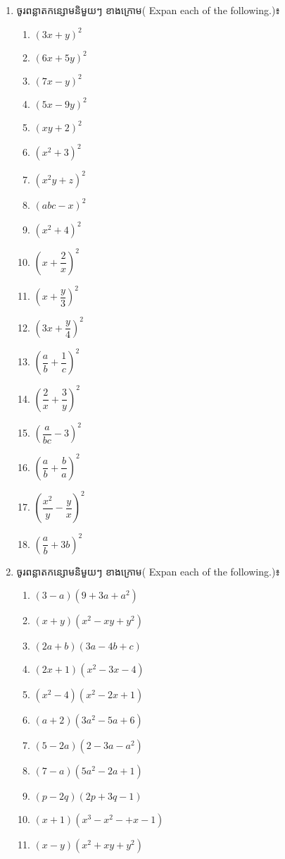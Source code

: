 \begin{enumerate}
\item  ចូរពន្លាតកន្សោមនិមួយៗ ខាងក្រោម( Expan each of the following.)៖
\begin{multicols}{3}
\begin{enumerate}[label=\alph*.]
\item $(3x+y)^2$
\item $(6x+5y)^2$
\item $(7x-y)^2$
\item $(5x-9y)^2$
\item $(xy+2)^2$
\item $(x^2+3)^2$
\item $(x^2y+z)^2$
\item $(abc-x)^2$
\item $(x^2+4)^2$
\item $\left(x+\dfrac{2}{x} \right)^2$
\item $\left(x+\dfrac{y}{3} \right)^2$
\item $\left( 3x+\dfrac{y}{4}\right)^2$
\item $\left(\dfrac{a}{b}+\dfrac{1}{c} \right)^2$
\item $\left( \dfrac{2}{x}+\dfrac{3}{y}\right)^2$
\item $\left(\dfrac{a}{bc} -3\right)^2$
\item $\left(\dfrac{a}{b}+\dfrac{b}{a}\right)^2$
\item $\left( \dfrac{x^2}{y}-\dfrac{y}{x}\right)^2$
\item $\left( \dfrac{a}{b}+3b\right)^2$
\end{enumerate}
\end{multicols}
\item  ចូរពន្លាតកន្សោមនិមួយៗ ខាងក្រោម( Expan each of the following.)៖
\begin{multicols}{2}
\begin{enumerate}[label=\alph*.]
\item $(3-a)(9+3a+a^2)$
\item $(x+y)(x^2-xy+y^2)$
\item $(2a+b)(3a-4b+c)$
\item $(2x+1)(x^2-3x-4)$
\item $(x^2-4)(x^2-2x+1)$
\item $(a+2)(3a^2-5a+6)$
\item $(5-2a)(2-3a-a^2)$
\item $(7-a)(5a^2-2a+1)$
\item $(p-2q)(2p+3q-1)$
\item $(x+1)(x^3-x^2-+x-1)$
\item $(x-y)(x^2+xy+y^2)$

\end{enumerate}
\end{multicols}
\end{enumerate}
